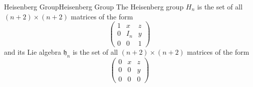 \documentclass[../main.tex]{subfiles}
\begin{document}
\begin{proposition}{Heisenberg Group}{Heisenberg Group}
  The Heisenberg group $H_n$ is the set of all $(n+2) \times (n+2)$ matrices of the form
  \begin{equation}
    \begin{pmatrix}
      1 & x & z \\
      0 & I_n & y \\
      0 & 0 & 1
    \end{pmatrix}
  \end{equation}
  and its Lie algebra $\mathfrak{h}_n$ is the set of all $(n+2) \times (n+2)$ matrices of the form
  \begin{equation}
    \begin{pmatrix}
      0 & x & z \\
      0 & 0 & y \\
      0 & 0 & 0
    \end{pmatrix}
  \end{equation}
\end{proposition}
\end{document}
